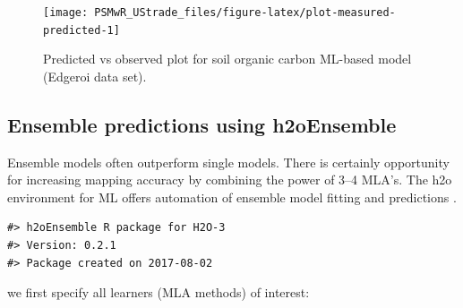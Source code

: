 \documentclass[graybox,natbib,nospthms,UStrade]{svmono}
\begin{document}
\begin{figure}[H]

{\centering \texttt{[image: PSMwR\_UStrade\_files/figure-latex/plot-measured-predicted-1]} 

}

\caption{Predicted vs observed plot for soil organic carbon ML-based model (Edgeroi data set).}\label{fig:plot-measured-predicted}
\end{figure}

\hypertarget{ensemble-predictions-using-h2oensemble}{%
\subsection{Ensemble predictions using h2oEnsemble}\label{ensemble-predictions-using-h2oensemble}}

Ensemble models often outperform single models. There is certainly opportunity for increasing mapping accuracy by combining the power of 3--4 MLA's. The h2o environment for ML offers automation of ensemble model fitting and predictions \citep{ledell2015scalable}.

\begin{verbatim}
#> h2oEnsemble R package for H2O-3
#> Version: 0.2.1
#> Package created on 2017-08-02
\end{verbatim}

we first specify all learners (MLA methods) of interest:
\end{document}
